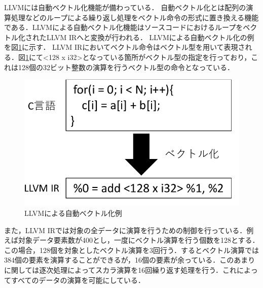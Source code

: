 
LLVMには自動ベクトル化機能が備わっている．
自動ベクトル化とは配列の演算処理などのループによる繰り返し処理をベクトル命令の形式に置き換える機能である．LLVMによる自動ベクトル化機能はソースコードにおけるループをベクトル化されたLLVM IRへと変換が行われる．
LLVMによる自動ベクトル化の例を図\ref{fig:LLVM_auto_vec}に示す．
LLVM IRにおいてベクトル命令はベクトル型を用いて表現される．図\ref{fig:LLVM_auto_vec}にて<128 x i32>となっている箇所がベクトル型の指定を行っており，これは128個の32ビット整数の演算を行うベクトル型の命令となっている．

\begin{figure}[b]
    \centering
    \includegraphics[scale=0.7]{image/Auto_vectorize.pdf}
    \caption{LLVMによる自動ベクトル化例}
    \label{fig:LLVM_auto_vec}
\end{figure}

また，LLVM IRでは対象の全データに演算を行うための制御を行っている．例えば対象データ要素数が400とし，一度にベクトル演算を行う個数を128とする．この場合，128個を対象としたベクトル演算を3回行う．するとベクトル演算では384個の要素を演算することができるが，16個の要素が余っている．このあまりに関しては逐次処理によってスカラ演算を16回繰り返す処理を行う．これによってすべてのデータの演算を可能にしている．